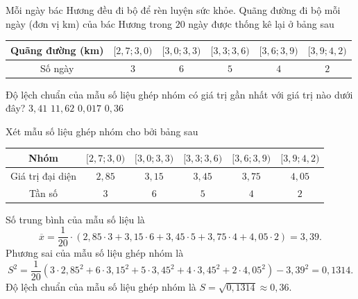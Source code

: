 \begin{ex}%
	Mỗi ngày bác Hương đều đi bộ để rèn luyện sức khỏe. Quãng đường đi bộ mỗi ngày (đơn vị km) của bác Hương trong $20$ ngày được thống kê lại ở bảng sau
	\begin{center}
		\begin{tabular}{|c|c|c|c|c|c|}
			\hline
			Quãng đường (km)	&$[2{,}7;3{,}0)$  & $[3{,}0;3{,}3)$ & $[3{,}3;3{,}6)$ & $[3{,}6;3{,}9)$ & $[3{,}9;4{,}2)$ \\
			\hline
			Số ngày	& $3$ & $6$ & $5$ & $4$ & $2$ \\
			\hline
		\end{tabular}
	\end{center}
	Độ lệch chuẩn của mẫu số liệu ghép nhóm có giá trị gần nhất với giá trị nào dưới đây?
	\choice 
	{$3{,}41$}
	{$11{,}62$}
	{$0{,}017$}
	{\True $0{,}36$}
	\loigiai 
	{
		Xét mẫu số liệu ghép nhóm cho bởi bảng sau
		\begin{center}
			\begin{tabular}{|c|c|c|c|c|c|}
				\hline
				Nhóm &$[2{,}7;3{,}0)$  & $[3{,}0;3{,}3)$ & $[3{,}3;3{,}6)$ & $[3{,}6;3{,}9)$ & $[3{,}9;4{,}2)$ \\
				\hline
				Giá trị đại diện & $2{,}85$ & $3{,}15$ & $3{,}45$ & $3{,}75$ & $4{,}05$ \\
				\hline
				Tần số	& $3$ & $6$ & $5$ & $4$ & $2$ \\
				\hline
			\end{tabular}
		\end{center}
		Số trung bình của mẫu số liệu là 
		$$\overline{x}=\dfrac{1}{20}\cdot (2{,}85\cdot 3+3{,}15\cdot 6+3{,}45\cdot 5+3{,}75\cdot 4+4{,}05\cdot 2)=3{,}39.$$
		Phương sai của mẫu số liệu ghép nhóm là 
		$$S^2=\dfrac{1}{20}\left(3\cdot 2{,}85^2+6\cdot 3{,}15^2+5\cdot 3{,}45^2+4\cdot 3{,}45^2+2\cdot 4{,}05^2\right)-3{,}39^2=0{,}1314.$$
		Độ lệch chuẩn của mẫu số liệu ghép nhóm là $S=\sqrt{0{,}1314}\approx 0{,}36$.
	}
\end{ex}

